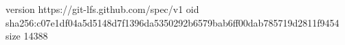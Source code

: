 version https://git-lfs.github.com/spec/v1
oid sha256:c07e1df04a5d5148d7f1396da5350292b6579bab6ff00dab785719d2811f9454
size 14388
